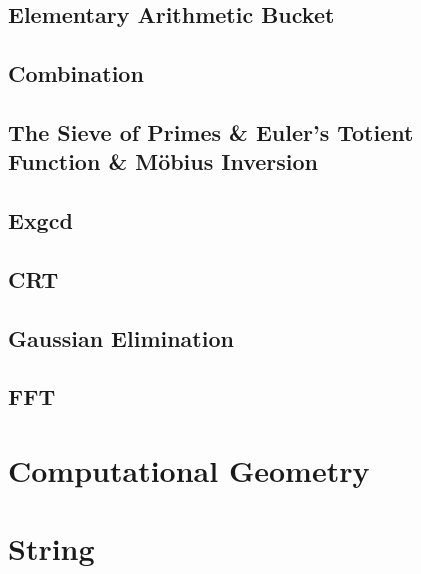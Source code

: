 \documentclass[a4paper]{article}
\begin{document}
\subsection{Elementary Arithmetic Bucket}



\subsection{Combination}



\subsection{The Sieve of Primes & Euler's Totient Function & Möbius Inversion}



\subsection{Exgcd}



\subsection{CRT}



\subsection{Gaussian Elimination}



\subsection{FFT}

\section{Computational Geometry}



\pagebreak

\section{String}
\end{document}
